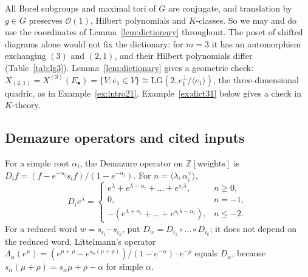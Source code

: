 \documentclass[11pt]{amsart}
\theoremstyle{definition}
\theoremstyle{remark}
\newcommand{\LG}{\mathrm{LG}}
\newcommand{\cO}{\mathcal{O}}
\newcommand{\Z}{\mathbb{Z}}
\begin{document}
All Borel subgroups and maximal tori of $G$ are conjugate, and translation by $g\in G$
preserves $\cO(1)$, Hilbert polynomials and $K$-classes. So we may and do use the
coordinates of Lemma~\ref{lem:dictionary} throughout. The poset of shifted diagrams alone would
not fix the dictionary: for $m=3$ it has an automorphism exchanging $(3)$ and $(2,1)$, and
their Hilbert polynomials differ (Table~\ref{tab:lg3}). Lemma~\ref{lem:dictionary} gives a
geometric check: $X_{(2,1)}=X^{(3)}(E_\bullet)=\{V:e_1\in V\}\cong\LG(2,e_1^\perp/\langle
e_1\rangle)$, the three-dimensional quadric, as in Example~\ref{ex:intro21}. Example~\ref{ex:dict31}
below gives a check in $K$-theory.

\subsection{Demazure operators and cited inputs}\label{ssec:inputs}
For a simple root $\alpha_i$, the Demazure operator on $\Z[\text{weights}]$ is
$D_if=(f-e^{-\alpha_i}s_if)/(1-e^{-\alpha_i})$. For $n=\langle\lambda,\alpha_i^\vee\rangle$,
\[ D_ie^\lambda=\begin{cases} e^\lambda+e^{\lambda-\alpha_i}+\dots+e^{s_i\lambda}, & n\ge0,\\ 0, & n=-1,\\ -(e^{\lambda+\alpha_i}+\dots+e^{s_i\lambda-\alpha_i}), & n\le-2.\end{cases} \]
For a reduced word $w=s_{i_1}\cdots s_{i_k}$, put $D_w=D_{i_1}\circ\dots\circ D_{i_k}$; it
does not depend on the reduced word. Littelmann's operator
$\Lambda_\alpha(e^\mu)=(e^{\mu+\rho}-e^{s_\alpha(\mu+\rho)})/(1-e^{-\alpha})\cdot e^{-\rho}$
equals $D_\alpha$, because $s_\alpha(\mu+\rho)=s_\alpha\mu+\rho-\alpha$ for simple $\alpha$.
\end{document}
